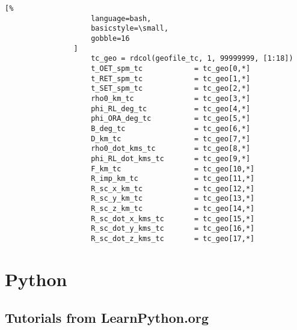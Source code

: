 \documentclass[crop=false,class=book,oneside]{standalone}
\begin{document}
                \begin{lstlisting}[%
                    language=bash,
                    basicstyle=\small,
                    gobble=16
                ]
                    tc_geo = rdcol(geofile_tc, 1, 99999999, [1:18])
                    t_OET_spm_tc            = tc_geo[0,*]
                    t_RET_spm_tc            = tc_geo[1,*]
                    t_SET_spm_tc            = tc_geo[2,*]
                    rho0_km_tc              = tc_geo[3,*]
                    phi_RL_deg_tc           = tc_geo[4,*]
                    phi_ORA_deg_tc          = tc_geo[5,*]
                    B_deg_tc                = tc_geo[6,*]
                    D_km_tc                 = tc_geo[7,*]
                    rho0_dot_kms_tc         = tc_geo[8,*]
                    phi_RL_dot_kms_tc       = tc_geo[9,*]
                    F_km_tc                 = tc_geo[10,*]
                    R_imp_km_tc             = tc_geo[11,*]
                    R_sc_x_km_tc            = tc_geo[12,*]
                    R_sc_y_km_tc            = tc_geo[13,*]
                    R_sc_z_km_tc            = tc_geo[14,*]
                    R_sc_dot_x_kms_tc       = tc_geo[15,*]
                    R_sc_dot_y_kms_tc       = tc_geo[16,*]
                    R_sc_dot_z_kms_tc       = tc_geo[17,*]
                \end{lstlisting}
    \section{Python}
        \subsection{Tutorials from LearnPython.org}
\end{document}
